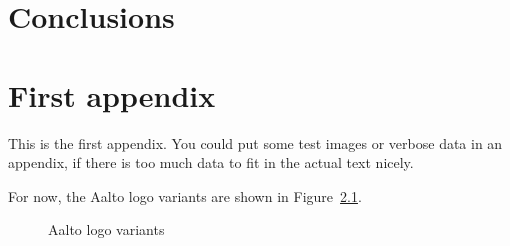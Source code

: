 \documentclass[12pt,a4paper,oneside,pdftex]{report}
\begin{document}
% 

\chapter{Conclusions}
\label{chapter:conclusions}

% 



\appendix
% 

\chapter{First appendix}
\label{chapter:first-appendix}

This is the first appendix. You could put some test images or verbose data in an
appendix, if there is too much data to fit in the actual text nicely.

For now, the Aalto logo variants are shown in Figure~\ref{fig:aaltologo}.

\begin{figure}
\begin{center}
\caption{Aalto logo variants}
\label{fig:aaltologo}
\end{center}
\end{figure}


\end{document}
